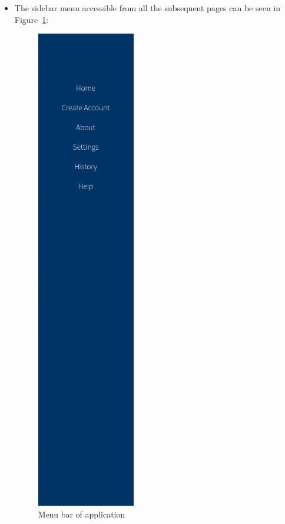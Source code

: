 \documentclass[10pt,twocolumn]{witseiepaper}
\begin{document}
		\begin{itemize}
			\item The sidebar menu accessible from all the subsequent pages can be seen in Figure~\ref{menu}:
			\begin{figure}[htbp]
				\centering
				\includegraphics[scale = 0.3]{../images/menu.jpg}
				\caption{Menu bar of application}
				\label{menu}
			\end{figure}
			

\end{itemize}
\end{document}
